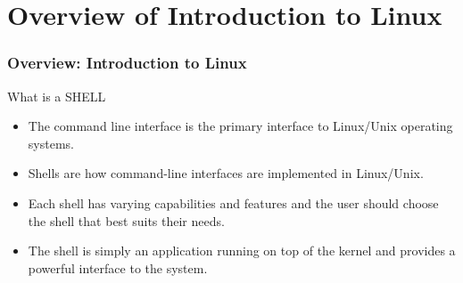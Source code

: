 \documentclass[slidestop,mathserif,compress,xcolor=svgnames]{beamer}
\newenvironment{eblock}[0]
{
\begin{beamerboxesrounded}[upper=uppercol2,lower=lowercol2,shadow=true]}
{\end{beamerboxesrounded}}
\begin{document}
\section{Overview of Introduction to Linux}
\begin{frame}[label=day1]
  \frametitle{\small Overview: Introduction to Linux}
  \begin{eblock}{What is a SHELL}
    \begin{itemize}
      \item The command line interface is the primary interface to Linux/Unix operating systems.
      \item Shells are how command-line interfaces are implemented in Linux/Unix.
      \item Each shell has varying capabilities and features and the user should choose the shell that best suits their needs.
      \item The shell is simply an application running on top of the kernel and provides a powerful interface to the system.
    \end{itemize}
  \end{eblock}
\end{frame}
\end{document}
